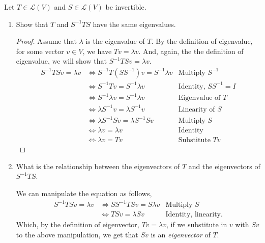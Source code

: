 Let $T \in \mathcal{L}(V)$ and $S \in \mathcal{L}(V)$ be invertible.
        \begin{enumerate}
        \item Show that $T$ and $S^{-1}TS$ have the same eigenvalues.
        \begin{mybox}
        \begin{proof}
                Assume that $\lambda$ is the eigenvalue of $T$. By the definition of eigenvalue, for some vector $v \in V$, we have $Tv = \lambda v$. And, again, the the definition of eigenvalue, we will show that $S^{-1}TSv = \lambda v$.
                \begin{align*}
                        S^{-1}TSv = \lambda v & \iff  S^{-1}T(SS^{-1})v = S^{-1} \lambda v & \text{Multiply } S^{-1}\\
                        &\iff S^{-1}Tv =  S^{-1} \lambda v  & \text{Identity, } SS^{-1} = I\\
                        & \iff S^{-1} \lambda v =  S^{-1} \lambda v & \text{Eigenvalue of } T\\
                        & \iff \lambda S^{-1}  v =  \lambda S^{-1}  v & \text{Linearity of } S\\
                        & \iff \lambda S^{-1}S  v =   \lambda S^{-1}Sv & \text{Multiply } S\\
                        &\iff \lambda v = \lambda v & \text{Identity}\\
                        &\iff \lambda v = Tv & \text{Substitute }Tv
                \end{align*} 
        \end{proof}
        \end{mybox}

        \item What is the relationship between the eigenvectors of $T$ and the eigenvectors of $S^{-1}TS$.
        \begin{mybox}
                We can manipulate the equation as follows,
                \begin{align*}
                        S^{-1}TSv = \lambda v & \iff SS^{-1}TSv = S \lambda v & \text{Multiply }S\\
                        &\iff TSv = \lambda S v & \text{Identity, linearity.}
                \end{align*} 
                Which, by the definition of eigenvector, $Tv = \lambda v$, if we substitute in $v$ with $Sv$ to the above manipulation, we get that $Sv$ is an \textit{eigenvector} of $T$.
        \end{mybox}
        \end{enumerate}
        